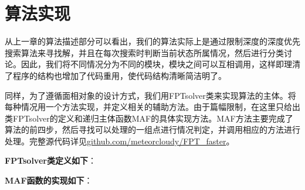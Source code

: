 \section{算法实现}

从上一章的算法描述部分可以看出，我们的算法实际上是通过限制深度的深度优先搜索算法来寻找解，并且在每次搜索时判断当前状态所属情况，然后进行分类讨论。因此，我们将不同情况分为不同的模块，模块之间可以互相调用，这样即理清了程序的结构也增加了代码重用，使代码结构清晰简洁明了。

同样，为了遵循面相对象的设计方式，我们用FPTsolver类来实现算法的主体。将每种情况用一个方法实现，并定义相关的辅助方法。由于篇幅限制，在这里只给出类FPTsolver的定义和递归主体函数MAF的具体实现方法。MAF方法主要完成了算法的前四步，然后寻找可以处理的一组点进行情况判定，并调用相应的方法进行处理。完整源代码详见\href{https://github.com/meteorcloudy/FPT_faster}{github.com/meteorcloudy/FPT\_faster}。

$ $\\ \textbf{FPTsolver类定义如下}：

$ $\\\textbf{MAF函数的实现如下}：























